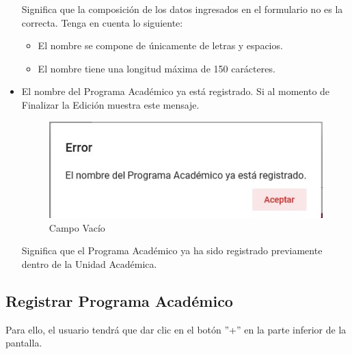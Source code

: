 \begin{itemize}
                	Significa que la composición de los datos ingresados en el formulario no es la correcta. Tenga en cuenta lo siguiente:

                	\begin{itemize}
                		\item El nombre se compone de únicamente de letras y espacios.

                        \item El nombre tiene una longitud máxima de 150 carácteres.
                	\end{itemize}

                \item El nombre del Programa Académico ya está registrado.
                    Si al momento de Finalizar la Edición muestra este mensaje.

                     \begin{figure}[!hbtp]
                    \centering
                    \hypertarget{vacio}{\includegraphics[width=0.7\linewidth]{images/SP3/Yareg}}
                    \caption{Campo Vacío}
                    \label{vacio}
                    \end{figure}

                    Significa que el Programa Académico ya ha sido registrado previamente dentro de la Unidad Académica.



            \end{itemize}
        \subsection{Registrar Programa Académico}

            Para ello, el usuario tendrá que dar clic en el botón ''+'' en la parte inferior de la pantalla.

